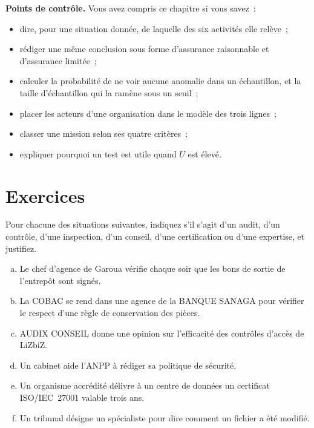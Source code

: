 \begin{boxinfo}
\textbf{Points de contrôle.} Vous avez compris ce chapitre si vous savez~:
\begin{itemize}
    \item dire, pour une situation donnée, de laquelle des six activités
          elle relève~;
    \item rédiger une même conclusion sous forme d'assurance raisonnable et
          d'assurance limitée~;
    \item calculer la probabilité de ne voir aucune anomalie dans un
          échantillon, et la taille d'échantillon qui la ramène sous un
          seuil~;
    \item placer les acteurs d'une organisation dans le modèle des trois
          lignes~;
    \item classer une mission selon ses quatre critères~;
    \item expliquer pourquoi un test est utile quand $U$ est élevé.
\end{itemize}
\end{boxinfo}

\section*{Exercices}

\begin{boxexo}[title={\ding{45}\quad Exercice~1.1. Quelle activité~? \niveaubase}]
Pour chacune des situations suivantes, indiquez s'il s'agit d'un audit,
d'un contrôle, d'une inspection, d'un conseil, d'une certification ou d'une
expertise, et justifiez.
\begin{enumerate}[(a)]
    \item Le chef d'agence de Garoua vérifie chaque soir que les bons de
          sortie de l'entrepôt sont signés.
    \item La COBAC se rend dans une agence de la BANQUE SANAGA pour vérifier
          le respect d'une règle de conservation des pièces.
    \item AUDIX CONSEIL donne une opinion sur l'efficacité des contrôles
          d'accès de LiZbiZ.
    \item Un cabinet aide l'ANPP à rédiger sa politique de sécurité.
    \item Un organisme accrédité délivre à un centre de données un
          certificat ISO/IEC~27001 valable trois ans.
    \item Un tribunal désigne un spécialiste pour dire comment un fichier a
          été modifié.
\end{enumerate}
\end{boxexo}

